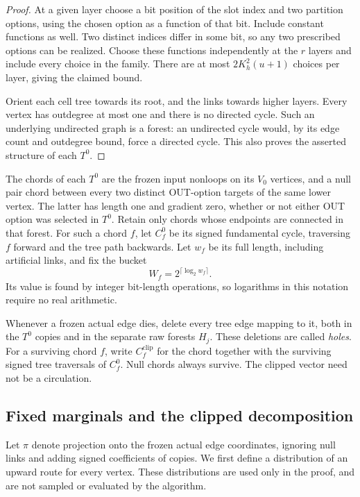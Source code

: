 \begin{proof}
At a given layer choose a bit position of the slot index and two
partition options, using the chosen option as a function of that bit.
Include constant functions as well.  Two distinct indices differ in
some bit, so any two prescribed options can be realized.  Choose these
functions independently at the $r$ layers and include every choice in
the family.  There are at most $2K_h^2(u+1)$ choices per layer, giving
the claimed bound.

Orient each cell tree towards its root, and the links towards higher
layers.  Every vertex has outdegree at most one and there is no directed
cycle.  Such an underlying undirected graph is a forest: an undirected
cycle would, by its edge count and outdegree bound, force a directed
cycle.  This also proves the asserted structure of each $T^0$.
\end{proof}

The chords of each $T^0$ are the frozen input nonloops on its $V_0$
vertices, and a null pair chord between every two distinct OUT-option
targets of the same lower vertex.  The latter has length one and
gradient zero, whether or not either OUT option was selected in $T^0$.
Retain only chords whose endpoints are connected in that forest.
For such a chord $f$, let $C_f^0$ be its signed fundamental cycle,
traversing $f$ forward and the tree path backwards.  Let $w_f$ be its
full length, including artificial links, and fix the bucket
\begin{equation}
\label{back:bucket}
                         W_f=2^{\lceil\log_2 w_f\rceil}.
\end{equation}
Its value is found by integer bit-length operations, so logarithms in
this notation require no real arithmetic.

Whenever a frozen actual edge dies, delete every tree edge mapping to
it, both in the $T^0$ copies and in the separate raw forests $H_j$.
These deletions are called \emph{holes}.  For a surviving chord $f$,
write $C_f^{\mathrm{clip}}$ for the chord together with the surviving
signed tree traversals of $C_f^0$.  Null chords always survive.
The clipped vector need not be a circulation.

\subsection{Fixed marginals and the clipped decomposition}

Let $\pi$ denote projection onto the frozen actual edge coordinates,
ignoring null links and adding signed coefficients of copies.  We
first define a distribution of an upward route for every vertex.
These distributions are used only in the proof, and are not sampled
or evaluated by the algorithm.

